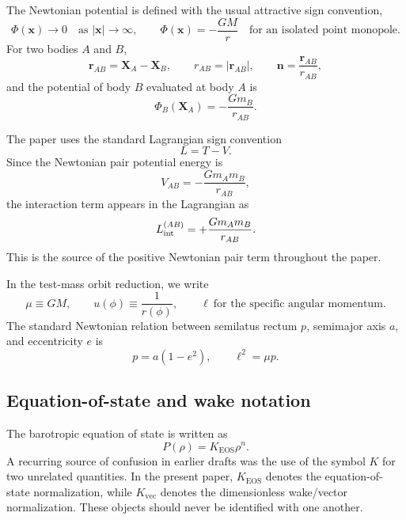 \documentclass[11pt]{article}
\newcommand{\x}{\mathbf x}
\newcommand{\nvec}{\mathbf n}
\newcommand{\Kvec}{K_{\mathrm{vec}}}
\newcommand{\KEOS}{K_{\mathrm{EOS}}}
\newcommand{\PhiN}{\Phi}
\begin{document}
The Newtonian potential is defined with the usual attractive sign convention,
\begin{equation}
\PhiN(\x)\to 0 \quad \text{as } |\x|\to\infty,
\qquad
\PhiN(\x)=-\frac{GM}{r}
\quad \text{for an isolated point monopole}.
\label{eq:notation-potential-sign}
\end{equation}
For two bodies \(A\) and \(B\),
\begin{equation}
\mathbf r_{AB}=\mathbf X_A-\mathbf X_B,
\qquad
r_{AB}=|\mathbf r_{AB}|,
\qquad
\nvec=\frac{\mathbf r_{AB}}{r_{AB}},
\label{eq:notation-pair-separation}
\end{equation}
and the potential of body \(B\) evaluated at body \(A\) is
\begin{equation}
\Phi_B(\mathbf X_A)=-\frac{Gm_B}{r_{AB}}.
\label{eq:notation-pair-potential}
\end{equation}

The paper uses the standard Lagrangian sign convention
\begin{equation}
L=T-V.
\label{eq:notation-LTV}
\end{equation}
Since the Newtonian pair potential energy is
\begin{equation}
V_{AB}=-\frac{Gm_A m_B}{r_{AB}},
\end{equation}
the interaction term appears in the Lagrangian as
\begin{equation}
L_{\rm int}^{(AB)}=+\frac{Gm_A m_B}{r_{AB}}.
\label{eq:notation-newtonian-pair-term}
\end{equation}
This is the source of the positive Newtonian pair term throughout the paper.

In the test-mass orbit reduction, we write
\begin{equation}
\mu\equiv GM,
\qquad
u(\phi)\equiv \frac{1}{r(\phi)},
\qquad
\ell \ \text{for the specific angular momentum}.
\label{eq:notation-orbit}
\end{equation}
The standard Newtonian relation between semilatus rectum \(p\), semimajor axis \(a\), and
eccentricity \(e\) is
\begin{equation}
p=a(1-e^2),
\qquad
\ell^2=\mu p.
\label{eq:notation-kepler}
\end{equation}

\subsection{Equation-of-state and wake notation}
\label{app:notation-eos-wake}

The barotropic equation of state is written as
\begin{equation}
P(\rho)=\KEOS \rho^n.
\label{eq:notation-eos}
\end{equation}
A recurring source of confusion in earlier drafts was the use of the symbol \(K\) for two
unrelated quantities. In the present paper, \(\KEOS\) denotes the equation-of-state
normalization, while \(\Kvec\) denotes the dimensionless wake/vector normalization.
These objects should never be identified with one another.
\end{document}

